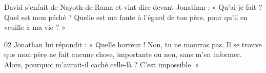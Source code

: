 David s’enfuit de Nayoth-de-Rama et vint dire devant Jonathan : « Qu’ai-je fait ? Quel est mon péché ? Quelle est ma faute à l’égard de ton père, pour qu’il en veuille à ma vie ? »

02 Jonathan lui répondit : « Quelle horreur ! Non, tu ne mourras pas. Il se trouve que mon père ne fait aucune chose, importante ou non, sans m’en informer. Alors, pourquoi m’aurait-il caché celle-là ? C’est impossible. »
